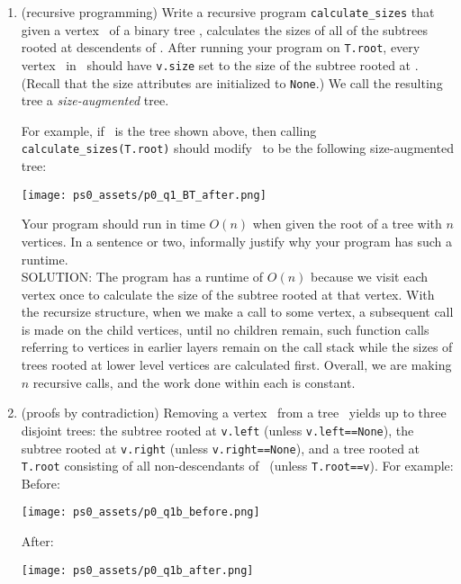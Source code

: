 \documentclass[11pt]{article}
\begin{document}
\begin{enumerate}
 \begin{enumerate}
 \item \label{part:calculatesizes} (recursive programming)
 Write a recursive program \texttt{calculate\_sizes} that given a vertex \btv\ of a binary tree \treeT, calculates the sizes of all of the subtrees rooted at descendents of \btv.  After running your program on \texttt{T.root}, every vertex \btv\ in \treeT\ should have \texttt{v.size} set to the size of the subtree rooted at \btv. (Recall that the size attributes are initialized to \texttt{None}.)  We call the resulting tree a {\em size-augmented} tree.
 
For example, if \treeT\  is the  tree shown above, 
then calling \texttt{calculate\_sizes(T.root)} should modify  \treeT\ to be the following size-augmented tree:

 \texttt{[image: ps0\_assets/p0\_q1\_BT\_after.png]}

 Your program should run in time $O(n)$ when given the root of a tree with $n$ vertices. In a sentence or two, informally justify why your program has such a runtime. \\
 
 SOLUTION: The program has a runtime of $O(n)$ because we visit each vertex once to calculate the size of the subtree rooted at that vertex. With the recursize structure, when we make a call to some vertex, a subsequent call is made on the child vertices, until no children remain, such function calls referring to vertices in earlier layers remain on the call stack while the sizes of trees rooted at lower level vertices are calculated first. Overall, we are making $n$ recursive calls, and the work done within each is constant. 
 
 \item (proofs by contradiction) \label{part:contradiction}
 Removing a vertex \btv\ from a tree \treeT\ yields up to three disjoint trees: the subtree rooted at
 \texttt{v.left} (unless \texttt{v.left==None}), the subtree rooted at
 \texttt{v.right} (unless \texttt{v.right==None}), and a tree rooted at \texttt{T.root} consisting of all non-descendants of \btv\ (unless \texttt{T.root==v}).  For example:
 \\

 Before:
 
 \texttt{[image: ps0\_assets/p0\_q1b\_before.png]}
 
 
 After:
 
  \texttt{[image: ps0\_assets/p0\_q1b\_after.png]}


\end{enumerate}
\end{enumerate}
\end{document}
